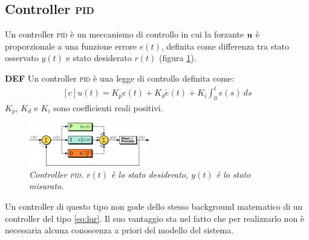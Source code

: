 \subsection{Controller \textsc{pid}}\label{subsec:intro-pid}
Un controller \textsc{pid} è un meccanismo di controllo in cui la forzante $\bf u$ è proporzionale a una funzione
errore $e(t)$, definita come differenza tra stato osservato $y(t)$ e stato desiderato $r(t)$ (figura \ref{fig:pid}).

\begin{framed}
  \textbf{DEF}
  Un controller \textsc{pid} è una legge di controllo definita come:
  \begin{equation}
    \begin{aligned}[c]
      u(t) = K_p e(t) + K_d \dot e(t) + K_i \int_0^t e(s)\ ds
    \end{aligned}
    \label{eq:pid}
  \end{equation}
  $K_p$, $K_d$ e $K_i$ sono coefficienti reali positivi.
\end{framed}


\begin{figure}[h]
  \includegraphics[width=0.47\textwidth]{../assets/diagramma pid.pdf}
  \caption{\emph{Controller \textsc{pid}. $r(t)$ è lo stato desiderato, $y(t)$ è lo stato misurato.}}
  \label{fig:pid}
\end{figure}

Un controller di questo tipo non gode dello stesso background matematico di un controller del tipo \eqref{eq:lqr}.
Il suo vantaggio sta nel fatto che per realizzarlo non è necessaria alcuna conoscenza a priori del modello del sistema.
